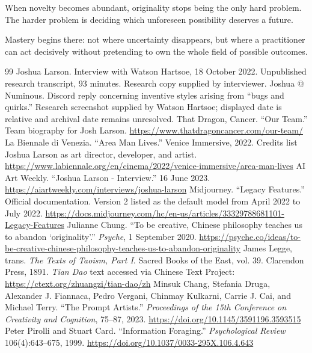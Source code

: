 \documentclass[11pt]{article}
\begin{document}
When novelty becomes abundant, originality stops being the only hard problem. The harder problem is deciding which unforeseen possibility deserves a future.

Mastery begins there: not where uncertainty disappears, but where a practitioner can act decisively without pretending to own the whole field of possible outcomes.

\begin{thebibliography}{99}
 Joshua Larson. Interview with Watson Hartsoe, 18 October 2022. Unpublished research transcript, 93 minutes. Research copy supplied by interviewer.
 Joshua @ Numinous. Discord reply concerning inventive styles arising from ``bugs and quirks.'' Research screenshot supplied by Watson Hartsoe; displayed date is relative and archival date remains unresolved.
 That Dragon, Cancer. ``Our Team.'' Team biography for Josh Larson. \url{https://www.thatdragoncancer.com/our-team/}
 La Biennale di Venezia. ``Area Man Lives.'' Venice Immersive, 2022. Credits list Joshua Larson as art director, developer, and artist. \url{https://www.labiennale.org/en/cinema/2022/venice-immersive/area-man-lives}
 AI Art Weekly. ``Joshua Larson - Interview.'' 16 June 2023. \url{https://aiartweekly.com/interviews/joshua-larson}
 Midjourney. ``Legacy Features.'' Official documentation. Version 2 listed as the default model from April 2022 to July 2022. \url{https://docs.midjourney.com/hc/en-us/articles/33329788681101-Legacy-Features}
 Julianne Chung. ``To be creative, Chinese philosophy teaches us to abandon `originality'.'' \emph{Psyche}, 1 September 2020. \url{https://psyche.co/ideas/to-be-creative-chinese-philosophy-teaches-us-to-abandon-originality}
 James Legge, trans. \emph{The Texts of Taoism, Part I}. Sacred Books of the East, vol. 39. Clarendon Press, 1891. \emph{Tian Dao} text accessed via Chinese Text Project: \url{https://ctext.org/zhuangzi/tian-dao/zh}
 Minsuk Chang, Stefania Druga, Alexander J. Fiannaca, Pedro Vergani, Chinmay Kulkarni, Carrie J. Cai, and Michael Terry. ``The Prompt Artists.'' \emph{Proceedings of the 15th Conference on Creativity and Cognition}, 75--87, 2023. \url{https://doi.org/10.1145/3591196.3593515}
 Peter Pirolli and Stuart Card. ``Information Foraging.'' \emph{Psychological Review} 106(4):643--675, 1999. \url{https://doi.org/10.1037/0033-295X.106.4.643}

\end{thebibliography}
\end{document}
